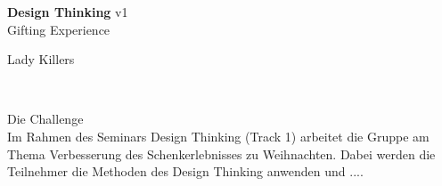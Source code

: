 \documentclass[12pt,ngerman, fleqn]{book} %
\begin{document}


\begingroup
\thispagestyle{empty}
\centering
\vspace*{5cm}
\par\normalfont\fontsize{35}{35}\sffamily\selectfont
\textbf{Design Thinking }{\normalsize v1} \\
{\LARGE Gifting Experience}\par %
\vspace*{1cm}
{\Huge Lady Killers}\par %
\endgroup


\newpage
~\vfill
\thispagestyle{empty}




\noindent Die Challenge \\
Im Rahmen des Seminars Design Thinking (Track 1) arbeitet die Gruppe am Thema Verbesserung des Schenkerlebnisses zu Weihnachten. Dabei werden die Teilnehmer die Methoden des Design Thinking anwenden und .... \\ %
\end{document}
